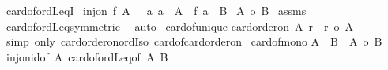 \begin{isabellebody}
\endisatagproof
{\isafoldproof}%
%
\isadelimproof
\isanewline
%
\endisadelimproof
\isanewline
{}\isamarkupfalse%
\ card{\isacharunderscore}{\kern0pt}of{\isacharunderscore}{\kern0pt}ordLeqI{\isacharcolon}{\kern0pt}\isanewline
{}\ {\isachardoublequoteopen}inj{\isacharunderscore}{\kern0pt}on\ f\ A{\isachardoublequoteclose}\ \ {\isachardoublequoteopen}{\isasymAnd}\ a{\isachardot}{\kern0pt}\ a\ {\isasymin}\ A\ {\isasymLongrightarrow}\ f\ a\ {\isasymin}\ B{\isachardoublequoteclose}\isanewline
{}\ {\isachardoublequoteopen}{\isacharbar}{\kern0pt}A{\isacharbar}{\kern0pt}\ {\isasymle}o\ {\isacharbar}{\kern0pt}B{\isacharbar}{\kern0pt}{\isachardoublequoteclose}\isanewline
%
\isadelimproof
%
\endisadelimproof
%
\isatagproof
{}\isamarkupfalse%
\ assms\ \isamarkupfalse%
\ card{\isacharunderscore}{\kern0pt}of{\isacharunderscore}{\kern0pt}ordLeq{\isacharbrackleft}{\kern0pt}symmetric{\isacharbrackright}{\kern0pt}\ \isamarkupfalse%
\ auto%
\endisatagproof
{\isafoldproof}%
%
\isadelimproof
\isanewline
%
\endisadelimproof
\isanewline
{}\isamarkupfalse%
\ card{\isacharunderscore}{\kern0pt}of{\isacharunderscore}{\kern0pt}unique{\isacharcolon}{\kern0pt}\isanewline
{\isachardoublequoteopen}card{\isacharunderscore}{\kern0pt}order{\isacharunderscore}{\kern0pt}on\ A\ r\ {\isasymLongrightarrow}\ r\ {\isacharequal}{\kern0pt}o\ {\isacharbar}{\kern0pt}A{\isacharbar}{\kern0pt}{\isachardoublequoteclose}\isanewline
%
\isadelimproof
%
\endisadelimproof
%
\isatagproof
{}\isamarkupfalse%
\ {\isacharparenleft}{\kern0pt}simp\ only{\isacharcolon}{\kern0pt}\ card{\isacharunderscore}{\kern0pt}order{\isacharunderscore}{\kern0pt}on{\isacharunderscore}{\kern0pt}ordIso\ card{\isacharunderscore}{\kern0pt}of{\isacharunderscore}{\kern0pt}card{\isacharunderscore}{\kern0pt}order{\isacharunderscore}{\kern0pt}on{\isacharparenright}{\kern0pt}%
\endisatagproof
{\isafoldproof}%
%
\isadelimproof
\isanewline
%
\endisadelimproof
\isanewline
{}\isamarkupfalse%
\ card{\isacharunderscore}{\kern0pt}of{\isacharunderscore}{\kern0pt}mono{}{\isacharcolon}{\kern0pt}\isanewline
{\isachardoublequoteopen}A\ {\isasymle}\ B\ {\isasymLongrightarrow}\ {\isacharbar}{\kern0pt}A{\isacharbar}{\kern0pt}\ {\isasymle}o\ {\isacharbar}{\kern0pt}B{\isacharbar}{\kern0pt}{\isachardoublequoteclose}\isanewline
%
\isadelimproof
%
\endisadelimproof
%
\isatagproof
{}\isamarkupfalse%
\ inj{\isacharunderscore}{\kern0pt}on{\isacharunderscore}{\kern0pt}id{\isacharbrackleft}{\kern0pt}of\ A{\isacharbrackright}{\kern0pt}\ card{\isacharunderscore}{\kern0pt}of{\isacharunderscore}{\kern0pt}ordLeq{\isacharbrackleft}{\kern0pt}of\ A\ B{\isacharbrackright}{\kern0pt}\ \isamarkupfalse%

\end{isabellebody}
